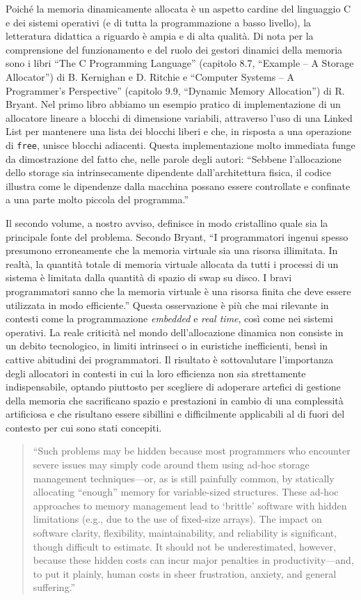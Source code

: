 Poiché la memoria dinamicamente allocata è un aspetto cardine del linguaggio C e dei sistemi operativi (e di tutta la programmazione a basso livello), la letteratura didattica a riguardo è ampia e di alta qualità. Di nota per la comprensione del funzionamento e del ruolo dei gestori dinamici della memoria sono i libri ``The C Programming Language'' (capitolo 8.7, ``Example – A Storage Allocator'') di B. Kernighan e D. Ritchie e ``Computer Systems – A Programmer’s Perspective'' (capitolo 9.9, ``Dynamic Memory Allocation'') di R. Bryant. Nel primo libro abbiamo un esempio pratico di implementazione di un allocatore lineare a blocchi di dimensione variabili, attraverso l’uso di una Linked List per mantenere una lista dei blocchi liberi e che, in risposta a una operazione di \texttt{free}, unisce blocchi adiacenti. Questa implementazione molto immediata funge da dimostrazione del fatto che, nelle parole degli autori: ``Sebbene l'allocazione dello storage sia intrinsecamente dipendente dall’architettura fisica, il codice illustra come le dipendenze dalla macchina possano essere controllate e confinate a una parte molto piccola del programma.''

Il secondo volume, a nostro avviso, definisce in modo cristallino quale sia la principale fonte del problema. Secondo Bryant, ``I programmatori ingenui spesso presumono erroneamente che la memoria virtuale sia una risorsa illimitata. In realtà, la quantità totale di memoria virtuale allocata da tutti i processi di un sistema è limitata dalla quantità di spazio di swap su disco. I bravi programmatori sanno che la memoria virtuale è una risorsa finita che deve essere utilizzata in modo efficiente.'' Questa osservazione è più che mai rilevante in contesti come la programmazione \textit{embedded} e \textit{real time}, così come nei sistemi operativi. La reale criticità nel mondo dell’allocazione dinamica non consiste in un debito tecnologico, in limiti intrinseci o in euristiche inefficienti, bensì in cattive abitudini dei programmatori. Il risultato è sottovalutare l’importanza degli allocatori in contesti in cui la loro efficienza non sia strettamente indispensabile, optando piuttosto per scegliere di adoperare artefici di gestione della memoria che sacrificano spazio e prestazioni in cambio di una complessità artificiosa e che risultano essere sibillini e difficilmente applicabili al di fuori del contesto per cui sono stati concepiti.

\begin{quote}
``Such problems may be hidden because most programmers who encounter severe issues may simply code around them using ad-hoc storage management techniques—or, as is still painfully common, by statically allocating ``enough'' memory for variable-sized structures. These ad-hoc approaches to memory management lead to ‘brittle’ software with hidden limitations (e.g., due to the use of fixed-size arrays). The impact on software clarity, flexibility, maintainability, and reliability is significant, though difficult to estimate. It should not be underestimated, however, because these hidden costs can incur major penalties in productivity—and, to put it plainly, human costs in sheer frustration, anxiety, and general suffering.''
\end{quote}

